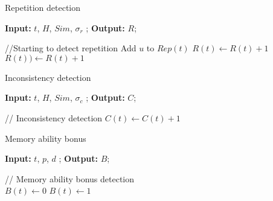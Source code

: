 \begin{algorithm}[ht]
\small
\caption{Repetition detection}
\label{algo:rep}
\hspace*{0.02in} {\bf Input:}
 $t$, $H$, $Sim$, $\sigma_{r}$
; \hspace*{0.02in} {\bf Output: } 
 $R$;
\begin{algorithmic}[1]
\State //Starting to detect repetition
		\State Add $u$ to $Rep(t)$
	\EndIf
\EndFor
        \State $ R(t) \leftarrow  R(t) + 1$ 
        \Else
        \State $R(t)) \leftarrow R(t) + 1$ 
        \EndIf
        \EndIf
    \EndIf



\end{algorithmic}
\end{algorithm}


\begin{algorithm}[ht]
\small
\caption{Inconsistency detection}
\label{algo:inconsist}
\hspace*{0.02in} {\bf Input:}
$t$, $H$, $Sim$, $\sigma_{c}$
; \hspace*{0.02in} {\bf Output:  } 
 $C$;
\begin{algorithmic}[1]
\State // Inconsistency detection
    \State $C(t) \leftarrow C(t) + 1$
   \EndIf
  \EndIf


\end{algorithmic}
\end{algorithm}

\begin{algorithm}[ht]
\small
\caption{Memory ability bonus}
\label{algo:bonus}
\hspace*{0.02in} {\bf Input:}
$t$, $p$, $d$
; \hspace*{0.02in} {\bf Output:  } 
$B$;
\begin{algorithmic}[1]
\State // Memory ability bonus detection \\
$B(t) \leftarrow 0$
   \State $B(t) \leftarrow 1$
  \EndIf
 \EndFor


\end{algorithmic}
\end{algorithm}

